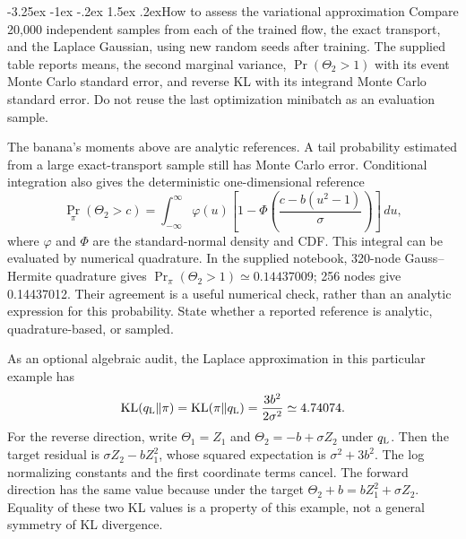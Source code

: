 \documentclass[11pt,a4paper]{article}
\makeatletter
\newcommand{\KL}{\operatorname{KL}}
\newcommand{\dd}{\,d}
\renewcommand\subsection{\@startsection{subsection}{2}{\z@}%
  {-3.25ex \@plus -1ex \@minus -.2ex}%
  {1.5ex \@plus .2ex}{\normalfont\large}}
\makeatother
\begin{document}
\subsection{How to assess the variational approximation}
Compare 20,000 independent samples from each of the trained flow, the exact
transport, and the Laplace Gaussian, using new random seeds after training.
The supplied table reports means, the second marginal variance,
$\Pr(\Theta_2>1)$ with its event Monte Carlo standard error, and reverse KL
with its integrand Monte Carlo standard error. Do not reuse the last
optimization minibatch as an evaluation sample.

The banana's moments above are analytic references. A tail probability estimated
from a large exact-transport sample still has Monte Carlo error. Conditional
integration also gives the deterministic one-dimensional reference
\[
 \Pr_\pi(\Theta_2>c)=
 \int_{-\infty}^{\infty}\varphi(u)
 \left[1-\Phi\left(\frac{c-b(u^2-1)}\sigma\right)\right]\dd u,
\]
where $\varphi$ and $\Phi$ are the standard-normal density and CDF. This integral
can be evaluated by numerical quadrature. In the supplied notebook,
320-node Gauss--Hermite quadrature gives $\Pr_\pi(\Theta_2>1)\simeq0.14437009$;
256 nodes give 0.14437012. Their agreement is a useful numerical check, rather
than an analytic expression for this probability. State whether a reported
reference is analytic, quadrature-based, or sampled.

As an optional algebraic audit, the Laplace approximation in this particular
example has
\[
 \KL(q_{\rm L}\Vert\pi)
 =\KL(\pi\Vert q_{\rm L})
 =\frac{3b^2}{2\sigma^2}\simeq4.74074.
\]
For the reverse direction, write $\Theta_1=Z_1$ and $\Theta_2=-b+\sigma Z_2$ under
$q_{\rm L}$. Then the target residual is $\sigma Z_2-bZ_1^2$, whose squared
expectation is $\sigma^2+3b^2$. The log normalizing constants and the first
coordinate terms cancel. The forward direction has the same value because
under the target $\Theta_2+b=bZ_1^2+\sigma Z_2$. Equality of these two KL values
is a property of this example, not a general symmetry of KL divergence.
\end{document}

